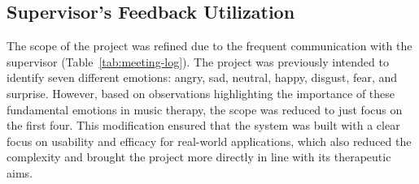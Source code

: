 \subsection{Supervisor's Feedback Utilization}
The scope of the project was refined due to the frequent communication with the supervisor (Table~\ref{tab:meeting-log}). 
The project was previously intended to identify seven different emotions: angry, sad, neutral, happy, disgust, fear, and surprise.
However, based on observations highlighting the importance of these fundamental emotions in music therapy, the scope was reduced to just focus on the first four.
This modification ensured that the system was built with a clear focus on usability and efficacy for real-world applications, which also reduced the complexity and brought the project more directly in line with its therapeutic aims.
